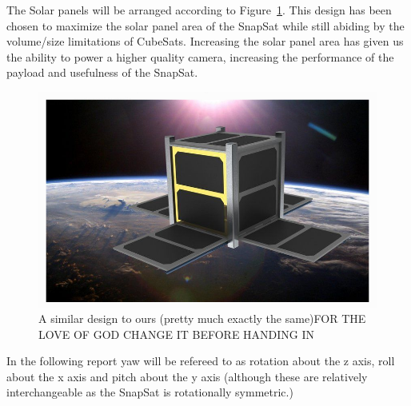 The Solar panels will be arranged according to Figure~\ref{fig:flower}.  This design has been chosen to maximize the solar panel area of the SnapSat while still abiding by the volume/size limitations of CubeSats.  Increasing the solar panel area has given us the ability to power a higher quality camera, increasing the performance of the payload and usefulness of the SnapSat.

\begin{figure}[H]
\label{fig:flower}
\includegraphics[width=\textwidth]{flower.png}
\caption{A similar design to ours (pretty much exactly the same)FOR THE LOVE OF GOD CHANGE IT BEFORE HANDING IN}
\end{figure}

In the following report yaw will be refereed to as rotation about the z axis, roll about the x axis and pitch about the y axis (although these are relatively interchangeable as the SnapSat is rotationally symmetric.)

\begin{figure}[H]
\end{figure}
